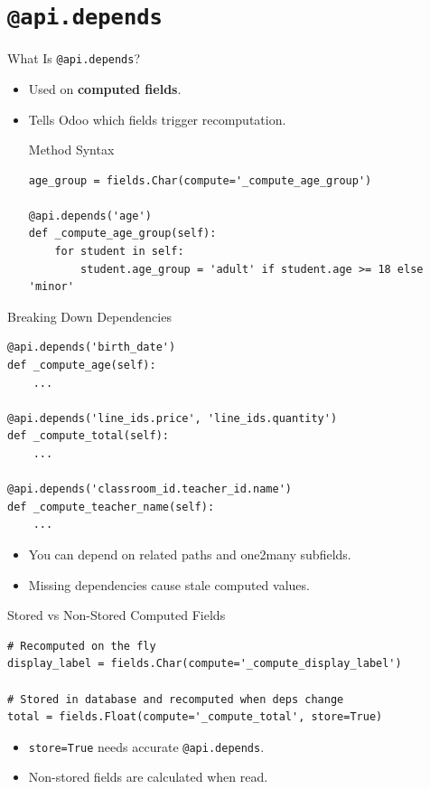 \section{\texttt{@api.depends}}

\begin{frame}[fragile]{What Is \texttt{@api.depends}?}
	\begin{itemize}
		\item Used on \textbf{computed fields}.
		\item Tells Odoo which fields trigger recomputation.
\begin{block}{Method Syntax}
\begin{lstlisting}
age_group = fields.Char(compute='_compute_age_group')

@api.depends('age')
def _compute_age_group(self):
	for student in self:
		student.age_group = 'adult' if student.age >= 18 else 'minor'
\end{lstlisting}
\end{block}
	\end{itemize}
\end{frame}

\begin{frame}[fragile]{Breaking Down Dependencies}
\begin{lstlisting}
@api.depends('birth_date')
def _compute_age(self):
	...

@api.depends('line_ids.price', 'line_ids.quantity')
def _compute_total(self):
	...

@api.depends('classroom_id.teacher_id.name')
def _compute_teacher_name(self):
	...
\end{lstlisting}
	\begin{itemize}
		\item You can depend on related paths and one2many subfields.
		\item Missing dependencies cause stale computed values.
	\end{itemize}
\end{frame}

\begin{frame}[fragile]{Stored vs Non-Stored Computed Fields}
\begin{lstlisting}
# Recomputed on the fly
display_label = fields.Char(compute='_compute_display_label')

# Stored in database and recomputed when deps change
total = fields.Float(compute='_compute_total', store=True)
\end{lstlisting}
	\begin{itemize}
		\item \texttt{store=True} needs accurate \texttt{@api.depends}.
		\item Non-stored fields are calculated when read.
	\end{itemize}
\end{frame}

